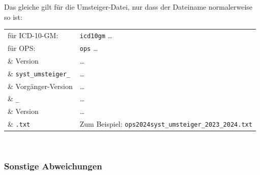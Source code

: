 \newpage %

Das gleiche gilt für die Umsteiger-Datei, nur dass der Dateiname normalerweise so ist:

\begingroup
\renewcommand{\arraystretch}{1.0}
\begin{tabular}{p{4cm}l}
für ICD-10-GM: & \texttt{icd10gm} \ldots\\
für OPS: & \texttt{ops} \ldots\\
\& Version & \ldots\\
\& \texttt{syst\_umsteiger\_} & \ldots\\
\& Vorgänger-Version & \ldots\\
\& \texttt{\_} & \ldots\\
\& Version & \ldots\\
\& \texttt{.txt} & Zum Beispiel: \texttt{ops2024syst\_umsteiger\_2023\_2024.txt}\\
\end{tabular}
\endgroup \\

\subsubsection{Sonstige Abweichungen}
\label{abweichungen}


